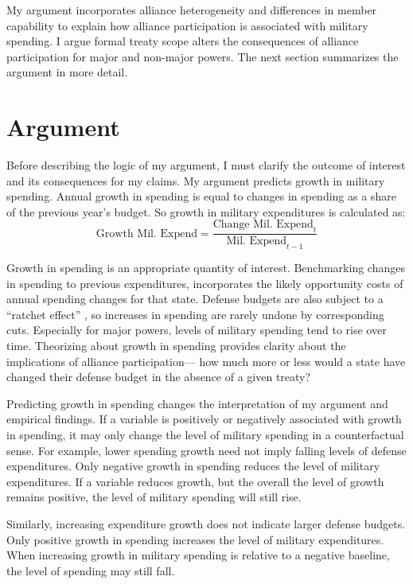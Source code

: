 \documentclass[12pt]{article}
\begin{document}
My argument incorporates alliance heterogeneity and differences in member capability to explain how alliance participation is associated with military spending. 
I argue formal treaty scope alters the consequences of alliance participation for major and non-major powers. 
The next section summarizes the argument in more detail. 



\section{Argument}

Before describing the logic of my argument, I must clarify the outcome of interest and its consequences for my claims. 
My argument predicts growth in military spending. 
Annual growth in spending is equal to changes in spending as a share of the previous year's budget. 
So growth in military expenditures is calculated as:
\begin{equation}
\mbox{Growth Mil. Expend} = \frac{ \mbox{Change Mil. Expend}_t }{ \mbox{Mil. Expend}_{t-1} }
\end{equation} 


Growth in spending is an appropriate quantity of interest. 
Benchmarking changes in spending to previous expenditures, incorporates the likely opportunity costs of annual spending changes for that state. 
Defense budgets are also subject to a ``ratchet effect'' \cite{Zielinskietal2017}, so increases in spending are rarely undone by corresponding cuts.
Especially for major powers, levels of military spending tend to rise over time. 
Theorizing about growth in spending provides clarity about the implications of alliance participation--- how much more or less would a state have changed their defense budget in the absence of a given treaty? 


Predicting growth in spending changes the interpretation of my argument and empirical findings. 
If a variable is positively or negatively associated with growth in spending, it may only change the level of military spending in a counterfactual sense. 
For example, lower spending growth need not imply falling levels of defense expenditures. 
Only negative growth in spending reduces the level of military expenditures. 
If a variable reduces growth, but the overall the level of growth remains positive, the level of military spending will still rise. 


Similarly, increasing expenditure growth does not indicate larger defense budgets. 
Only positive growth in spending increases the level of military expenditures. 
When increasing growth in military spending is relative to a negative baseline, the level of spending may still fall. 
\end{document}
